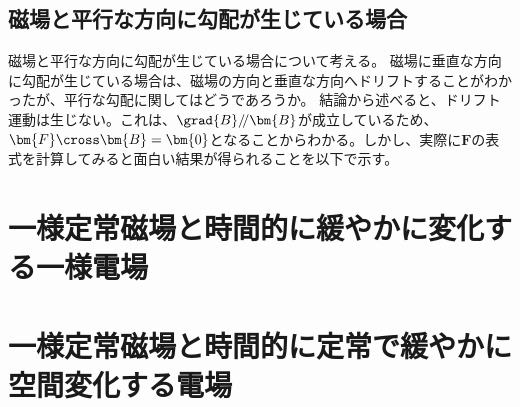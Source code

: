 \subsection{磁場と平行な方向に勾配が生じている場合}
磁場と平行な方向に勾配が生じている場合について考える。
磁場に垂直な方向に勾配が生じている場合は、磁場の方向と垂直な方向へドリフトすることがわかったが、平行な勾配に関してはどうであろうか。
結論から述べると、ドリフト運動は生じない。これは、$\grad{B}\varParallel \bm{B}$が成立しているため、
$\bm{F}\cross\bm{B} = \bm{0}$となることからわかる。しかし、実際に$\bm{F}$の表式を計算してみると面白い結果が得られることを以下で示す。

\section{一様定常磁場と時間的に緩やかに変化する一様電場}
\section{一様定常磁場と時間的に定常で緩やかに空間変化する電場}


